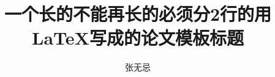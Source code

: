 \documentclass[master,oneside]{cuzthesis} %
\title{一个长的不能再长的必须分2行的用\LaTeX 写成的论文模板标题} %
\author{张无忌}
\institute{新媒体学院}         %
\begin{document}
\maketitle

\abstractmatter



\frontmatter
\tableofcontents %
\listoffigures   %
\listoftables    %
%

\mainmatter



\backmatter



%




\end{document}

